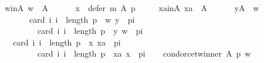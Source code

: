 \begin{isabellebody}
\ \ \ \ w{\isacharunderscore}{\kern0pt}in{\isacharunderscore}{\kern0pt}A{\isacharcolon}{\kern0pt}\ {\isachardoublequoteopen}w\ {\isasymin}\ A{\isachardoublequoteclose}\ \isanewline
\ \ \ \ {}{\isacharcolon}{\kern0pt}\ {\isachardoublequoteopen}x\ {\isasymin}\ defer\ m\ A\ p{\isachardoublequoteclose}\ \isanewline
\ \ \ \ xa{\isacharunderscore}{\kern0pt}in{\isacharunderscore}{\kern0pt}A{\isacharcolon}{\kern0pt}\ {\isachardoublequoteopen}xa\ {\isasymin}\ A{\isachardoublequoteclose}\ \isanewline
\ \ \ \ {}{\isacharcolon}{\kern0pt}\ {\isachardoublequoteopen}{\isasymforall}y{\isasymin}A\ {\isacharminus}{\kern0pt}\ {\isacharbraceleft}{\kern0pt}w{\isacharbraceright}{\kern0pt}{\isachardot}{\kern0pt}\isanewline
\ \ \ \ \ \ \ \ \ \ card\ {\isacharbraceleft}{\kern0pt}i{\isachardot}{\kern0pt}\ i\ {\isacharless}{\kern0pt}\ length\ p\ {\isasymand}\ {\isacharparenleft}{\kern0pt}w{\isacharcomma}{\kern0pt}\ y{\isacharparenright}{\kern0pt}\ {\isasymin}\ {\isacharparenleft}{\kern0pt}p{\isacharbang}{\kern0pt}i{\isacharparenright}{\kern0pt}{\isacharbraceright}{\kern0pt}\ {\isacharless}{\kern0pt}\isanewline
\ \ \ \ \ \ \ \ \ \ \ \ card\ {\isacharbraceleft}{\kern0pt}i{\isachardot}{\kern0pt}\ i\ {\isacharless}{\kern0pt}\ length\ p\ {\isasymand}\ {\isacharparenleft}{\kern0pt}y{\isacharcomma}{\kern0pt}\ w{\isacharparenright}{\kern0pt}\ {\isasymin}\ {\isacharparenleft}{\kern0pt}p{\isacharbang}{\kern0pt}i{\isacharparenright}{\kern0pt}{\isacharbraceright}{\kern0pt}{\isachardoublequoteclose}\ \isanewline
\ \ \ \ {}{\isacharcolon}{\kern0pt}\ {\isachardoublequoteopen}{\isasymnot}\ card\ {\isacharbraceleft}{\kern0pt}i{\isachardot}{\kern0pt}\ i\ {\isacharless}{\kern0pt}\ length\ p\ {\isasymand}\ {\isacharparenleft}{\kern0pt}x{\isacharcomma}{\kern0pt}\ xa{\isacharparenright}{\kern0pt}\ {\isasymin}\ {\isacharparenleft}{\kern0pt}p{\isacharbang}{\kern0pt}i{\isacharparenright}{\kern0pt}{\isacharbraceright}{\kern0pt}\ {\isacharless}{\kern0pt}\isanewline
\ \ \ \ \ \ \ \ \ \ \ \ card\ {\isacharbraceleft}{\kern0pt}i{\isachardot}{\kern0pt}\ i\ {\isacharless}{\kern0pt}\ length\ p\ {\isasymand}\ {\isacharparenleft}{\kern0pt}xa{\isacharcomma}{\kern0pt}\ x{\isacharparenright}{\kern0pt}\ {\isasymin}\ {\isacharparenleft}{\kern0pt}p{\isacharbang}{\kern0pt}i{\isacharparenright}{\kern0pt}{\isacharbraceright}{\kern0pt}{\isachardoublequoteclose}\isanewline
\ \ \isamarkupfalse%
\ {\isachardoublequoteopen}condorcet{\isacharunderscore}{\kern0pt}winner\ A\ p\ w{\isachardoublequoteclose}\isanewline
\ \ \ \ \isamarkupfalse%

\end{isabellebody}
